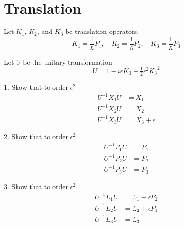 

\section*{Translation}

Let $K_1$, $K_2$, and $K_3$ be translation operators.
\begin{equation*}
K_1=\frac{1}{\hbar}P_1,\quad K_2=\frac{1}{\hbar}P_2,\quad K_3=\frac{1}{\hbar}P_3
\end{equation*}

Let $U$ be the unitary transformation
\begin{equation*}
U=1-i\epsilon K_3-\tfrac{1}{2}\epsilon^2{K_3}^2
\end{equation*}

1. Show that to order $\epsilon^2$
\begin{align*}
U^{-1}X_1U&=X_1
\\
U^{-1}X_2U&=X_2
\\
U^{-1}X_3U&=X_3+\epsilon
\end{align*}

2. Show that to order $\epsilon^2$
\begin{align*}
U^{-1}P_1U&=P_1
\\
U^{-1}P_2U&=P_2
\\
U^{-1}P_3U&=P_3
\end{align*}

3. Show that to order $\epsilon^2$
\begin{align*}
U^{-1}L_1U&=L_1-\epsilon P_2
\\
U^{-1}L_2U&=L_2+\epsilon P_1
\\
U^{-1}L_3U&=L_3
\end{align*}


